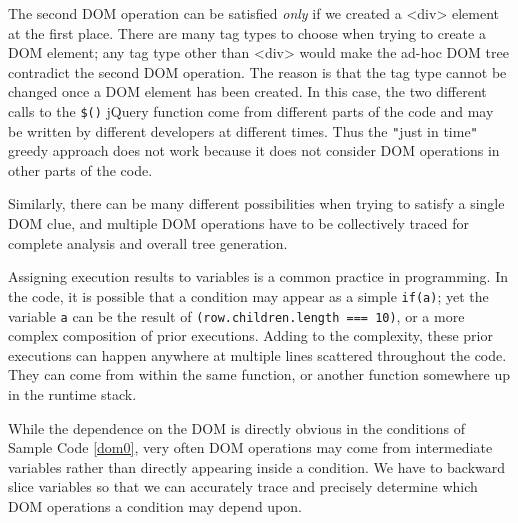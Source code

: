 

The second DOM operation can be satisfied {\em only} if we created a <div> element at the first place.  
There are many tag types to choose when trying to create a DOM element; any tag type other than <div> would make the ad-hoc DOM tree contradict the second DOM operation.  
The reason is that the tag type cannot be changed once a DOM element has been created.  
In this case, the two different calls to the {\tt \$()} jQuery function come from different parts of the code and may be written by different developers at different times.  
Thus the {\tt "}just in time{\tt "} greedy approach does not work because it does not consider DOM operations in other parts of the code.  

Similarly, there can be many different possibilities when trying to satisfy a single DOM clue, and multiple DOM operations have to be collectively traced for complete analysis and overall tree generation.   

Assigning execution results to variables is a common practice in programming.  
In the code, it is possible that a condition may appear as a simple {\tt if(a)}; yet the variable {\tt a} can be the result of {\tt (row.children.length === 10)}, or a more complex composition of prior executions. 
Adding to the complexity, these prior executions can happen anywhere at multiple lines scattered throughout the code.  
They can come from within the same function, or another function somewhere up in the runtime stack.

While the dependence on the DOM is directly obvious in the conditions of Sample Code \ref{dom0}, very often DOM operations may come from intermediate variables rather than directly appearing inside a condition.  
We have to backward slice variables so that we can accurately trace and precisely determine which DOM operations a condition may depend upon.  

